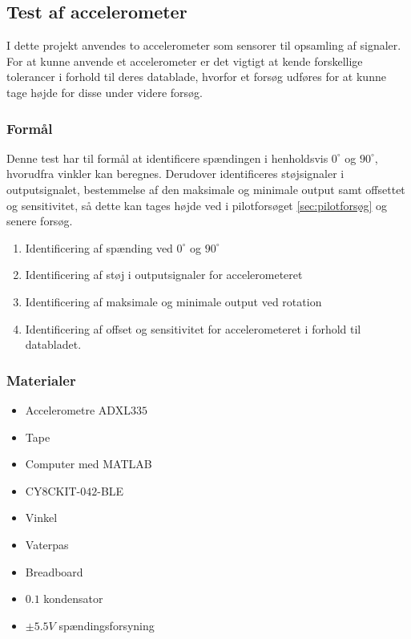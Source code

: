 \subsection{Test af accelerometer}
I dette projekt anvendes to accelerometer som sensorer til opsamling af signaler. For at kunne anvende et accelerometer er det vigtigt at kende forskellige tolerancer i forhold til deres datablade, hvorfor et forsøg udføres for at kunne tage højde for disse under videre forsøg.

\subsubsection{Formål}
Denne test har til formål at identificere spændingen i henholdsvis $0^{\circ}$ og $90^{\circ}$, hvorudfra vinkler kan beregnes. Derudover identificeres støjsignaler i outputsignalet, bestemmelse af den maksimale og minimale output samt offsettet og sensitivitet, så dette kan tages højde ved i pilotforsøget \autoref{sec:pilotforsøg} og senere forsøg. 

\begin{enumerate}
\item Identificering af spænding ved $0^{\circ}$ og $90^{\circ}$
\item Identificering af støj i outputsignaler for accelerometeret
\item Identificering af maksimale og minimale output ved rotation
\item Identificering af offset og sensitivitet for accelerometeret i forhold til databladet.
\end{enumerate}

\subsubsection{Materialer}
\begin{itemize}
\item Accelerometre ADXL$335$
\item Tape
\item Computer med MATLAB
\item CY$8$CKIT-$042$-BLE
\item Vinkel
\item Vaterpas
\item Breadboard
\item $0.1$ \mikroF kondensator 
\item $\pm 5.5 V$ spændingsforsyning
\end{itemize}

